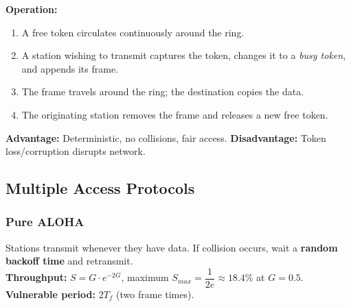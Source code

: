 \documentclass[12pt,a4paper]{article}
\begin{document}
\textbf{Operation:}
\begin{enumerate}[label=\textbf{\arabic*.}, leftmargin=*, itemsep=3pt]
  \item A free token circulates continuously around the ring.
  \item A station wishing to transmit captures the token, changes it to a \textit{busy token}, and appends its frame.
  \item The frame travels around the ring; the destination copies the data.
  \item The originating station removes the frame and releases a new free token.
\end{enumerate}
\textbf{Advantage:} Deterministic, no collisions, fair access. \textbf{Disadvantage:} Token loss/corruption disrupts network.

\begin{tcolorbox}[tikzbox, title={Token Ring Operation}]
\centering
{}
\end{tcolorbox}

\subsection{Multiple Access Protocols}

\subsubsection*{Pure ALOHA}
\begin{tcolorbox}[formulabox, title={\textbf{Pure ALOHA}}]
Stations transmit whenever they have data. If collision occurs, wait a \textbf{random backoff time} and retransmit.\\[4pt]
\textbf{Throughput:} $S = G \cdot e^{-2G}$, maximum $S_{max} = \dfrac{1}{2e} \approx 18.4\%$ at $G = 0.5$.\\
\textbf{Vulnerable period:} $2T_f$ (two frame times).
\end{tcolorbox}
\end{document}
